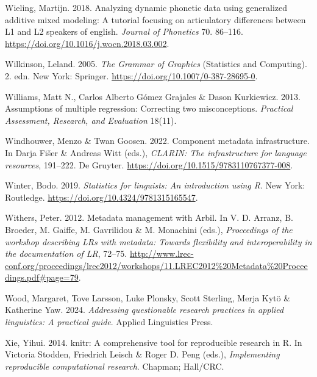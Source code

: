 \documentclass[
  letterpaper,
  DIV=11,
  numbers=noendperiod]{scrreprt}
\newlength{\cslhangindent}
\newenvironment{CSLReferences}[2] %
 {\begin{list}{}{%
  \setlength{\itemindent}{0pt}
  \setlength{\leftmargin}{0pt}
  \setlength{\parsep}{0pt}
  \ifodd #1
   \setlength{\leftmargin}{\cslhangindent}
   \setlength{\itemindent}{-1\cslhangindent}
  \fi
  \setlength{\itemsep}{#2\baselineskip}}}
 {\end{list}}
\begin{document}
\begin{CSLReferences}{1}{0}
Wieling, Martijn. 2018. Analyzing dynamic phonetic data using
generalized additive mixed modeling: A tutorial focusing on articulatory
differences between L1 and L2 speakers of english. \emph{Journal of
Phonetics} 70. 86--116.
\url{https://doi.org/10.1016/j.wocn.2018.03.002}.

Wilkinson, Leland. 2005. \emph{The {Grammar} of {Graphics}} (Statistics
and Computing). 2. edn. New York: Springer.
\url{https://doi.org/10.1007/0-387-28695-0}.

Williams, Matt N., Carlos Alberto Gómez Grajales \& Dason Kurkiewicz.
2013. Assumptions of multiple regression: Correcting two misconceptions.
\emph{Practical Assessment, Research, and Evaluation} 18(11).

Windhouwer, Menzo \& Twan Goosen. 2022. Component metadata
infrastructure. In Darja Fišer \& Andreas Witt (eds.), \emph{CLARIN: The
infrastructure for language resources}, 191--222. De Gruyter.
\url{https://doi.org/10.1515/9783110767377-008}.

Winter, Bodo. 2019. \emph{Statistics for linguists: An introduction
using {R}}. New York: Routledge.
\url{https://doi.org/10.4324/9781315165547}.

Withers, Peter. 2012. Metadata management with {A}rbil. In V. D. Arranz,
B. Broeder, M. Gaiffe, M. Gavrilidou \& M. Monachini (eds.),
\emph{Proceedings of the workshop describing LRs with metadata: Towards
flexibility and interoperability in the documentation of LR}, 72--75.
\url{http://www.lrec-conf.org/proceedings/lrec2012/workshops/11.LREC2012\%20Metadata\%20Proceedings.pdf\#page=79}.

Wood, Margaret, Tove Larsson, Luke Plonsky, Scott Sterling, Merja Kytö
\& Katherine Yaw. 2024. \emph{Addressing questionable research practices
in applied linguistics: A practical guide}. Applied Linguistics Press.

Xie, Yihui. 2014. {knitr}: A comprehensive tool for reproducible
research in {R}. In Victoria Stodden, Friedrich Leisch \& Roger D. Peng
(eds.), \emph{Implementing reproducible computational research}.
Chapman; Hall/CRC.


\end{CSLReferences}
\end{document}
